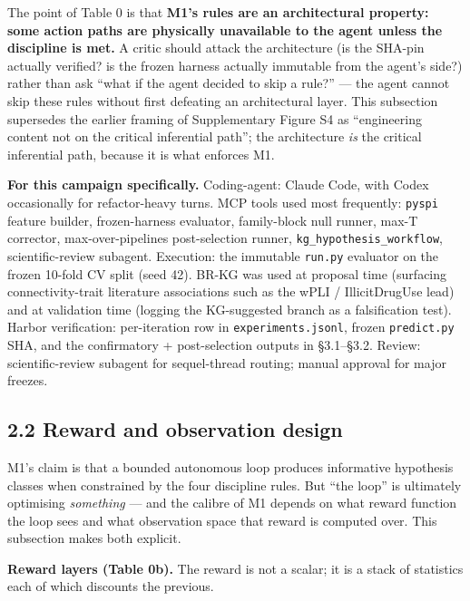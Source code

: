 \documentclass[11pt,letterpaper]{report}
\begin{document}
The point of Table 0 is that \textbf{M1's rules are an architectural property: some action paths are physically unavailable to the agent unless the discipline is met.} A critic should attack the architecture (is the SHA-pin actually verified? is the frozen harness actually immutable from the agent's side?) rather than ask ``what if the agent decided to skip a rule?'' --- the agent cannot skip these rules without first defeating an architectural layer. This subsection supersedes the earlier framing of Supplementary Figure S4 as ``engineering content not on the critical inferential path''; the architecture \emph{is} the critical inferential path, because it is what enforces M1.

\textbf{For this campaign specifically.} Coding-agent: Claude Code, with Codex occasionally for refactor-heavy turns. MCP tools used most frequently: \texttt{pyspi} feature builder, frozen-harness evaluator, family-block null runner, max-T corrector, max-over-pipelines post-selection runner, \texttt{kg\_hypothesis\_workflow}, scientific-review subagent. Execution: the immutable \texttt{run.py} evaluator on the frozen 10-fold CV split (seed 42). BR-KG was used at proposal time (surfacing connectivity-trait literature associations such as the wPLI / IllicitDrugUse lead) and at validation time (logging the KG-suggested branch as a falsification test). Harbor verification: per-iteration row in \texttt{experiments.jsonl}, frozen \texttt{predict.py} SHA, and the confirmatory + post-selection outputs in \S3.1--\S3.2. Review: scientific-review subagent for sequel-thread routing; manual approval for major freezes.

\subsection*{2.2 Reward and observation design}

M1's claim is that a bounded autonomous loop produces informative hypothesis classes when constrained by the four discipline rules. But ``the loop'' is ultimately optimising \emph{something} --- and the calibre of M1 depends on what reward function the loop sees and what observation space that reward is computed over. This subsection makes both explicit.

\textbf{Reward layers (Table 0b).} The reward is not a scalar; it is a stack of statistics each of which discounts the previous.
\end{document}
